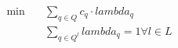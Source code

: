\begin{align}
  \min\quad & \sum_{q \in Q} c_{q} \cdot \mathit{lambda}_{q} \tag{eq\_0003} \\
  & \sum_{q \in Q^{l}} \mathit{lambda}_{q} = 1 \forall l \in L \tag{eq\_0004} \\
\end{align}
